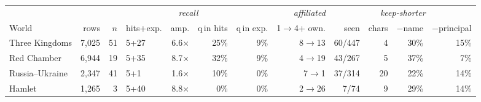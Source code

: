 \begin{tabular}{lrrlrrrrrrrr}
\toprule
& & \multicolumn{5}{c}{\emph{recall}} & \emph{affiliated} & \multicolumn{4}{c}{\emph{keep-shorter}} \\
\cmidrule(lr){3-7}\cmidrule(lr){8-8}\cmidrule(lr){9-12}
World & rows & $n$ & hits+exp. & amp. & q\,in hits & q\,in exp. & 1$\to$4+ own. & seen & chars & $-$name & $-$principal \\
\midrule
Three Kingdoms & 7,025 & 51 & 5+27 & 6.6$\times$ & 25\% & 9\% & 8$\to$13 & 60/447 & 4 & 30\% & 15\% \\
Red Chamber & 6,944 & 19 & 5+35 & 8.7$\times$ & 32\% & 9\% & 4$\to$19 & 43/267 & 5 & 37\% & 7\% \\
Russia--Ukraine & 2,347 & 41 & 5+1 & 1.6$\times$ & 10\% & 0\% & 7$\to$1 & 37/314 & 20 & 22\% & 14\% \\
Hamlet & 1,265 & 3 & 5+40 & 8.8$\times$ & 0\% & 0\% & 2$\to$26 & 7/74 & 9 & 29\% & 14\% \\
\bottomrule
\end{tabular}
